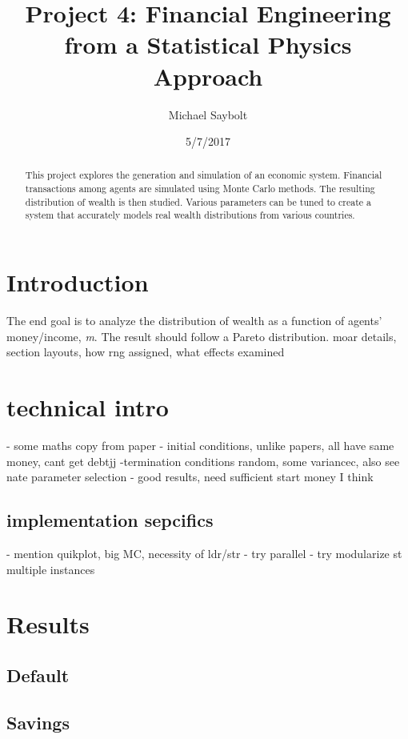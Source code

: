 \documentclass[12pt]{article} %
\begin{document}
\title{Project 4: Financial Engineering from a Statistical Physics Approach}
\author{Michael Saybolt}
\date{5/7/2017}
\maketitle
\pagebreak

\tableofcontents

\begin{abstract} %
This project explores the generation and simulation of an economic system. Financial transactions among agents are simulated using Monte Carlo methods. The resulting distribution of wealth is then studied. Various parameters can be tuned to create a system that accurately models real wealth distributions from various countries.
\end{abstract}

\section{Introduction}
The end goal is to analyze the distribution of wealth as a function of agents'
money/income, \textit{m}. The result should follow a Pareto distribution.
moar details, section layouts, how rng assigned, what effects examined

\section{technical intro}
- some maths
	copy from paper
- initial conditions, unlike papers, all have same money, cant get debtjj
-termination conditions
 random, some variancec, also see nate
parameter selection
 - good results, need sufficient start money I think

\subsection{implementation sepcifics}
	- mention quikplot, big MC, necessity of ldr/str
	- try parallel
	- try modularize st multiple instances
\section{Results}
\subsection{Default}
\subsection{Savings}
\end{document}
